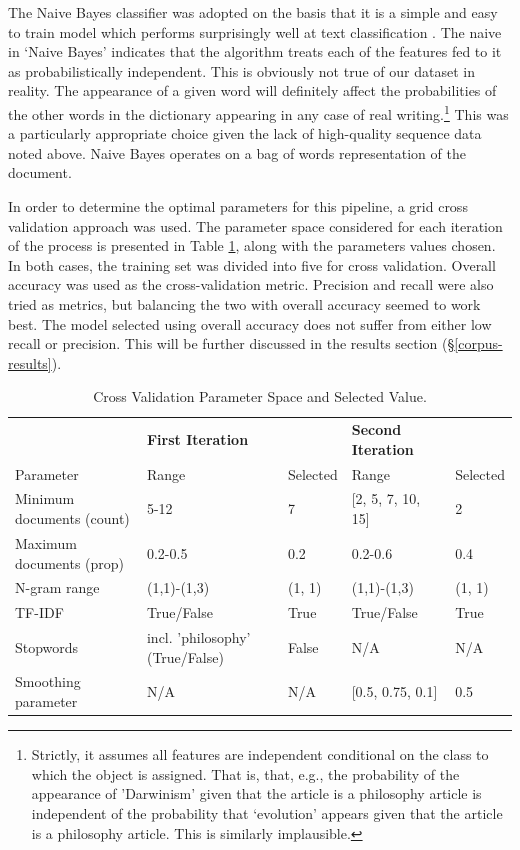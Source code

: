 \documentclass{article}
\begin{document}
The Naive Bayes classifier was adopted on the basis that it is a simple and easy to train model which performs surprisingly well at text classification \cite{zhang-2004}. The naive in `Naive Bayes' indicates that the algorithm treats each of the features fed to it as probabilistically independent. This is obviously not true of our dataset in reality. The appearance of a given word will definitely affect the probabilities of the other words in the dictionary appearing in any case of real writing.\footnote{Strictly, it assumes all features are independent conditional on the class to which the object is assigned. That is, that, e.g., the probability of the appearance of 'Darwinism' given that the article is a philosophy article is independent of the probability that `evolution' appears given that the article is a philosophy article. This is similarly implausible.} This was a particularly appropriate choice given the lack of high-quality sequence data noted above. Naive Bayes operates on a bag of words representation of the document. %

In order to determine the optimal parameters for this pipeline, a grid cross validation approach was used. The parameter space considered for each iteration of the process is presented in Table \ref{t:CV}, along with the parameters values chosen. In both cases, the training set was divided into five for cross validation. Overall accuracy was used as the cross-validation metric. Precision and recall were also tried as metrics, but balancing the two with overall accuracy seemed to work best. The model selected using overall accuracy does not suffer from either low recall or precision. This will be further discussed in the results section (\S \ref{corpus-results}).

\begin{table}[]
        \centering
        \footnotesize
        \begin{tabular}{l|ll|ll}
           & \textbf{First Iteration} & & \textbf{Second Iteration} & \\
          Parameter & Range & Selected & Range & Selected \\
          \hline
          Minimum documents (count) & 5-12 & 7 & [2, 5, 7, 10, 15] & 2 \\ %
          Maximum documents (prop) & 0.2-0.5 & 0.2 & 0.2-0.6 & 0.4 \\
          N-gram range & (1,1)-(1,3) & (1, 1) & (1,1)-(1,3) & (1, 1) \\
          TF-IDF & True/False & True & True/False & True \\
          Stopwords & incl. 'philosophy' (True/False) & False & N/A & N/A \\
          Smoothing parameter& N/A & N/A & [0.5, 0.75, 0.1] & 0.5
        \end{tabular}
        \caption{Cross Validation Parameter Space and Selected Value.}
        \label{t:CV}
\end{table}
\end{document}
